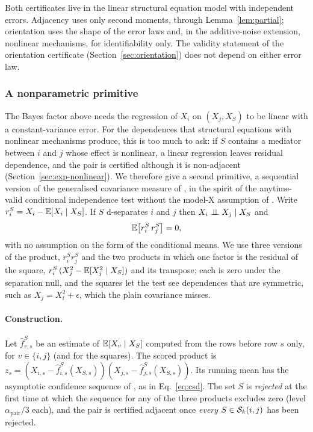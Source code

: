 \begin{remark}\label{rem:common}
Both certificates live in the linear structural equation model with
independent errors. Adjacency uses only second moments, through
Lemma~\ref{lem:partial}; orientation uses the shape of the error laws and, in
the additive-noise extension, nonlinear mechanisms, for identifiability only.
The validity statement of the orientation certificate
(Section~\ref{sec:orientation}) does not depend on either error law.
\end{remark}


\subsubsection{A nonparametric primitive}\label{sec:npprimitive}

The Bayes factor above needs the regression of $X_i$ on $(X_j,X_S)$ to be
linear with a constant-variance error. For the dependences that structural
equations with nonlinear mechanisms produce, this is too much to ask: if $S$
contains a mediator between $i$ and $j$ whose effect is nonlinear, a linear
regression leaves residual dependence, and the pair is certified although it is
non-adjacent (Section~\ref{sec:exp-nonlinear}). We therefore give a second
primitive, a sequential version of the generalised covariance measure of
\citet{shah2020hardness}, in the spirit of the anytime-valid conditional
independence test without the model-X assumption of
\citet{waudbysmith2023sequential}. Write
$r^{S}_{i}=X_i-\mathbb{E}[X_i\mid X_S]$. If $S$ d-separates $i$ and $j$ then
$X_i\perp\!\!\!\perp X_j\mid X_S$ and
\begin{equation}\label{eq:gcm}
\mathbb{E}\bigl[r^{S}_{i}\,r^{S}_{j}\bigr]=0 ,
\end{equation}
with no assumption on the form of the conditional means. We use three versions
of the product, $r_i^Sr_j^S$ and the two products in which one factor is the
residual of the square, $r_i^S\,(X_j^2-\mathbb{E}[X_j^2\mid X_S])$ and its transpose;
each is zero under the separation null, and the squares let the test see
dependences that are symmetric, such as $X_j=X_i^2+\epsilon$, which the plain
covariance misses.

\paragraph{Construction.} Let $\hat f^{S}_{v,s}$ be an estimate of
$\mathbb{E}[X_v\mid X_S]$ computed from the rows before row $s$ only, for $v\in\{i,j\}$
(and for the squares). The scored product is
$z_s=(X_{i,s}-\hat f^S_{i,s}(X_{S,s}))(X_{j,s}-\hat f^S_{j,s}(X_{S,s}))$. Its
running mean has the asymptotic confidence sequence of
\citet[Theorem~2.2]{waudbysmith2024asymptotic}, as in Eq.~\eqref{eq:csd}. The set
$S$ is \emph{rejected} at the first time at which the sequence for any of the three
products excludes zero (level $\alpha_{\mathrm{pair}}/3$ each), and the pair is
certified adjacent once \emph{every} $S\in\mathcal{S}_k(i,j)$ has been rejected.

